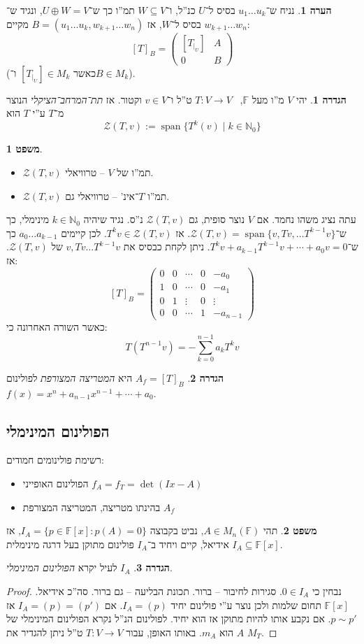 \documentclass[a4paper]{article}
\newcommand\N     {\mathbb{N}}
\newcommand\zc    {\mathcal{Z}}
\DeclareMathOperator{\Sp}      {span}
\newcommand\F         {\mathbb{F}}
\newcommand\co        {\colon}
\newcommand\pms[1]    {\begin{pmatrix}
		#1
\end{pmatrix}}
\theoremstyle{definition}
\newtheorem{Theorem}{משפט}
\newtheorem{definition}{הגדרה}
\newtheorem{Remark}{הערה}
\newcommand\theo  [1] {\begin{Theorem}#1\end{Theorem}}
\newcommand\defi  [1] {\begin{definition}#1\end{definition}}
\newcommand\rmark [1] {\begin{Remark}#1\end{Remark}}
\begin{document}
	\rmark{נניח ש־$u_1 \dots u_k$ בסיס ל־$U$ כנ''ל, ו־$W \subseteq V$ תמ''ו כך ש־$U \oplus W = V$, ונגיד ש־$w_{k + 1} \dots w_n$ בסיס ל־$W$, אז $B = (u_1 \dots u_k, w_{k + 1} \dots w_n)$ מקיים: 
		\[ [T]_B = \pms{[T_{|_U}] & A \\ 0 & B} \]
		(כאשר $[T_{|_U}] \in M_{k}$ ו־$B \in M_k$). 
	}
	
	\defi{יהי $V$ מ''ו מעל $\F$, \ $T \co V \to V$ ט''ל ו־$v \in V$ וקטור. אז \textit{תת־המרחב־הציקלי} הנוצר מ־$T$ ע''י $T$ הוא 
	\[ \mathcal{Z}(T, v) := \Sp\{T^k(v) \mid k \in \N_0\} \]}
	\theo{\,\begin{itemize}
			\item $\zc(T, v)$ תמ''ו של $V$ – טרוויאלי.
			\item $\zc(T, v)$ תמ''ו $T$־אינ' – טרוויאלי גם. 
	\end{itemize}}
	
	עתה נציג משהו נחמד. אם $V$ נוצר סופית, גם $\zc(T, v)$ נ''ס. נגיד שיהיה $k \in \N_0$ מינימלי, כך ש־$\zc(T, v) = \Sp\{v, Tv, \dots T^{k - 1} v\}$. אז $T^kv \in \zc(T, v)$. לכן קיימים $a_0 \dots a_{k - 1}$ כך ש־$T^kv + a_{k - 1}T^{k - 1}v + \cdots + a_0v = 0$. ניתן לקחת כבסיס את $v, Tv \dots T^{k - 1} v$ של $\zc(T, v)$. אז: 
	\[ [T]_B = \pms{0 & 0 & \cdots & 0 & -a_0
		\\ 1 & 0 & \cdots & 0&-a_1
		\\ 0 & 1 & \vdots & 0& \vdots
		\\ 0 & 0  & \cdots & 1 &-a_{n - 1}} \]
	כאשר השורה האחרונה כי: 
	\[ T(T^{n - 1}v)  = -\sum_{k = 0}^{n - 1}a_kT^kv \]
	\defi{$A_f = [T]_B$ היא \textit{המטריצה המצורפת} לפולינום $f(x) = x^{n} + a_{n - 1}x^{n - 1} + \cdots + a_0$. }
	
	\subsection{הפולינום המינימלי}
	
	רשימת פולינומים חמודים: 
	\begin{itemize}
		\item הפולינום האופייני $f_A = f_T = \det(Ix - A)$
		\item בהינתו מטריצה, המטריצה המצורפת $A_f$
	\end{itemize}
	
	\theo{תהי $A \in M_n(\F)$, נביט בקבוצה $I_A = \{p \in \F[x] \co p(A) = 0\}$, אז $I_A \subseteq \F[x]$ אידיאל, קיים ויחיד ב־$I_A$ פולינום מתוקן בעל דרגה מינימלית. }
	\defi{$I_A$ לעיל יקרא \textit{הפולינום המינימלי}. }
	\begin{proof}
		נבחין כי $0 \in I_A$. סגירות לחיבור – ברור. תכונת הבליעה – גם ברור. סה''כ אידיאל. 
		$\F[x]$ תחום שלמות ולכן נוצר ע''י פולינום יחיד $I_A = (p)$. אם $I_A = (p) = (p')$ אז $p \sim p'$. אם נקבע אותו להיות מתוקן אז הוא יחיד. לפולינום הנ''ל נקרא הפולינום המינימלי של $A$ הוא $m_A$. באותו האופן, עבור $T \co V \to V$ ט''ל ניתן להגדיר את $M_T$. 
	\end{proof}
	
\end{document}

